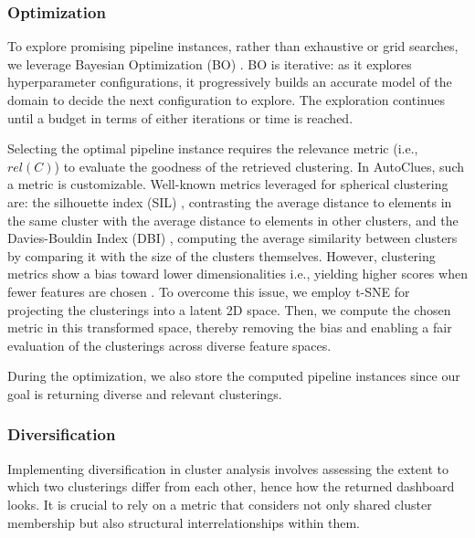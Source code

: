 \vspace{-0.4cm}
\subsubsection{Optimization}
To explore promising pipeline instances, rather than exhaustive or grid searches, we leverage Bayesian Optimization (BO) \cite{hutter2011sequential}.
%
BO is iterative: as it explores hyperparameter configurations, it progressively builds an accurate model of the domain to decide the next configuration to explore.
The exploration continues until a budget in terms of either iterations or time is reached.

Selecting the optimal pipeline instance requires the relevance metric (i.e., $rel(C)$) to evaluate the goodness of the retrieved clustering.
In AutoClues, such a metric is customizable.
%
Well-known metrics leveraged for spherical clustering are: the silhouette index (SIL) \cite{zhu2010clustering}, contrasting the average distance to elements in the same cluster with the average distance to elements in other clusters, and the Davies-Bouldin Index (DBI) \cite{dbi}, computing the average similarity between clusters by comparing it with the size of the clusters themselves.
%
However, clustering metrics show a bias toward lower dimensionalities i.e., yielding higher scores when fewer features are chosen \cite{lensen2017using,hancer2020new}. 
To overcome this issue, we employ t-SNE \cite{van2008visualizing} for projecting the clusterings into a latent 2D space. 
Then, we compute the chosen metric in this transformed space, thereby removing the bias and enabling a fair evaluation of the clusterings across diverse feature spaces.

During the optimization, we also store the computed pipeline instances since our goal is returning diverse and relevant clusterings.

\vspace{-0.4cm}
\subsubsection{Diversification}
Implementing diversification in cluster analysis involves assessing the extent to which two clusterings differ from each other, hence how the returned dashboard looks.
It is crucial to rely on a metric that considers not only shared cluster membership but also structural interrelationships within them.

